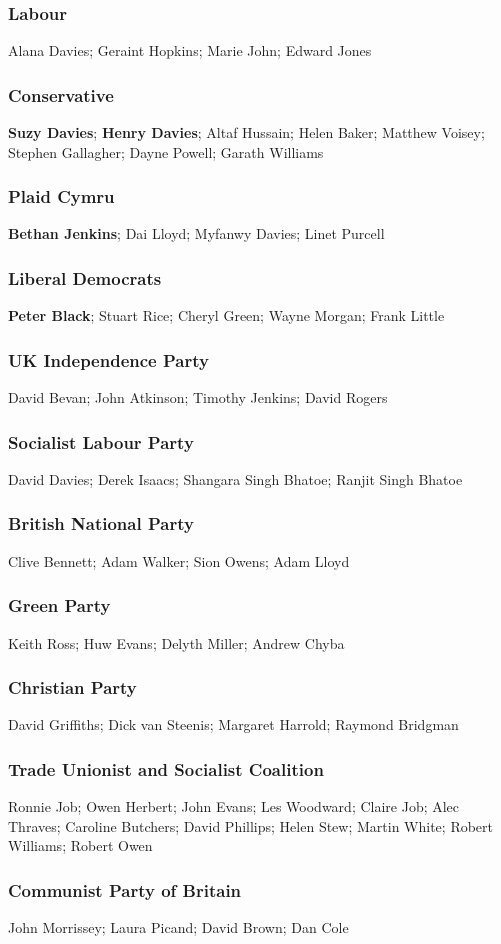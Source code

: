\begin{resultsiii}
\subsubsection*{Labour}
Alana Davies; Geraint Hopkins; Marie John; Edward Jones
\subsubsection*{Conservative}
\textbf{Suzy Davies}; \textbf{Henry Davies}; Altaf Hussain; Helen Baker; Matthew Voisey; Stephen Gallagher; Dayne Powell; Garath Williams
\subsubsection*{Plaid Cymru}
\textbf{Bethan Jenkins}; Dai Lloyd; Myfanwy Davies; Linet Purcell
\subsubsection*{Liberal Democrats}
\textbf{Peter Black}; Stuart Rice; Cheryl Green; Wayne Morgan; Frank Little
\subsubsection*{UK Independence Party}
David Bevan; John Atkinson; Timothy Jenkins; David Rogers
\subsubsection*{Socialist Labour Party}
David Davies; Derek Isaacs; Shangara Singh Bhatoe; Ranjit Singh Bhatoe
\subsubsection*{British National Party}
Clive Bennett; Adam Walker; Sion Owens; Adam Lloyd
\subsubsection*{Green Party}
Keith Ross; Huw Evans; Delyth Miller; Andrew Chyba
\subsubsection*{Christian Party}
David Griffiths; Dick van Steenis; Margaret Harrold; Raymond Bridgman
\subsubsection*{Trade Unionist and Socialist Coalition}
Ronnie Job; Owen Herbert; John Evans; Les Woodward; Claire Job; Alec Thraves; Caroline Butchers; David Phillips; Helen Stew; Martin White; Robert Williams; Robert Owen
\subsubsection*{Communist Party of Britain}
John Morrissey; Laura Picand; David Brown; Dan Cole
\end{resultsiii}

